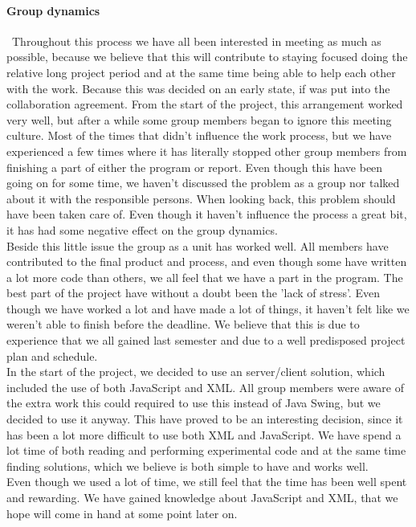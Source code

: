 \documentclass[a4paper,10pt,titlepage]{article}
\begin{document}
		\paragraph{Group dynamics}\mbox{}\
		Throughout this process we have all been interested in meeting as much as possible, because we believe that this will contribute to staying focused doing the relative long project period and at the same time being able to help each other with the work. Because this was decided on an early state, if was put into the collaboration agreement. From the start of the project, this arrangement worked very well, but after a while some group members began to ignore this meeting culture. Most of the times that didn't influence the work process, but we have experienced a few times where it has literally stopped other group members from finishing a part of either the program or report. Even though this have been going on for some time, we haven't discussed the problem as a group nor talked about it with the responsible persons. When looking back, this problem should have been taken care of. Even though it haven't influence the process a great bit, it has had some negative effect on the group dynamics. \\
		Beside this little issue the group as a unit has worked well. All members have contributed to the final product and process, and even though some have written a lot more code than others, we all feel that we have a part in the program. The best part of the project have without a doubt been the 'lack of stress'. Even though we have worked a lot and have made a lot of things, it haven't felt like we weren't able to finish before the deadline. We believe that this is due to experience that we all gained last semester and due to a well predisposed project plan and schedule. \\


In the start of the project, we decided to use an server/client solution, which included the use of both JavaScript and XML. All group members were aware of the extra work this could required to use this instead of Java Swing, but we decided to use it anyway. This have proved to be an interesting decision, since it has been a lot more difficult to use both XML and JavaScript. We have spend a lot time of both reading and performing experimental code and at the same time finding solutions, which we believe is both simple to have and works well.\\

Even though we used a lot of time, we still feel that the time has been well spent and rewarding. We have gained knowledge about JavaScript and XML, that we hope will come in hand at some point later on.\\
\end{document}
